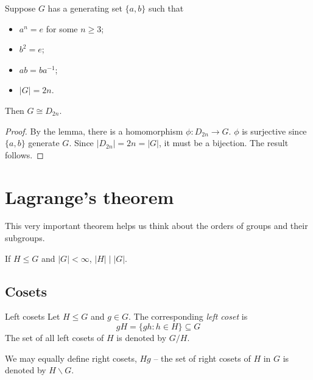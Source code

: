 \documentclass{../template/note}
\begin{document}
    \begin{proposition}
        Suppose \(G\) has a generating set \(\{a, b\}\) such that
        \begin{itemize}
            \item \(a^n = e\) for some \(n \geq 3\);
            \item \(b^2 = e\);
            \item \(ab = ba^{-1}\);
            \item \(|G| = 2n\).
        \end{itemize}
        Then \(G \cong D_{2n}\).
    \end{proposition}
    
    \begin{proof}
        By the lemma, there is a homomorphism \(\phi: D_{2n} \to G\). \(\phi\) is surjective since \(\{a, b\}\) generate \(G\). Since \(|D_{2n}| = 2n = |G|\), it must be a bijection. The result follows.
    \end{proof}
    
    
    
    



    \section{Lagrange's theorem}

    This very important theorem helps us think about the orders of groups and their subgroups.

    \begin{theorem}[Lagrange]
        If \(H \leq G\) and \(|G| < \infty\), \(|H| \mid |G|\).
    \end{theorem}
    
    \subsection{Cosets}

    \begin{definition}{Left cosets}
        Let \(H \leq G\) and \(g \in G\). The corresponding \emph{left coset} is
        \[
            gH = \{gh : h \in H\} \subseteq G
        \]
        The set of all left cosets of \(H\) is denoted by \(G/H\).
    \end{definition}
    
    \begin{remark*}
        We may equally define right cosets, \(Hg\) -- the set of right cosets of \(H\) in \(G\) is denoted by \(H \backslash G\).
    \end{remark*}
    
\end{document}
